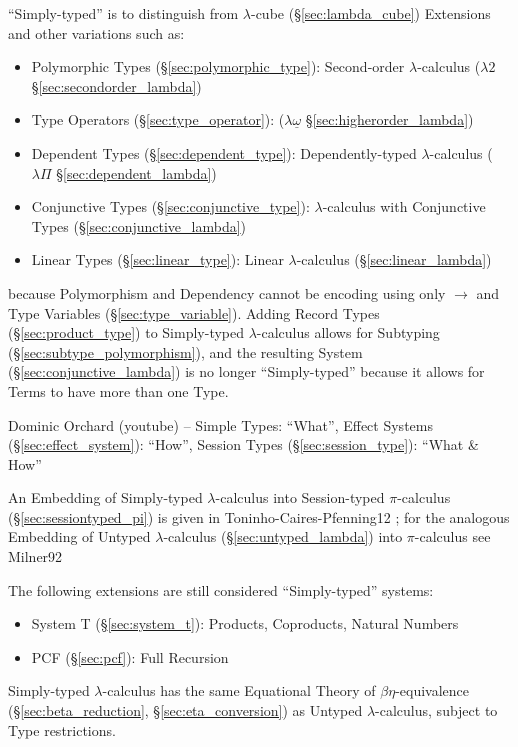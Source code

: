 ``Simply-typed'' is to distinguish from $\lambda$-cube
(\S\ref{sec:lambda_cube}) Extensions and other variations such as:
\begin{itemize}
  \item Polymorphic Types (\S\ref{sec:polymorphic_type}): Second-order
    $\lambda$-calculus ($\lambda2$ \S\ref{sec:secondorder_lambda})
  \item Type Operators (\S\ref{sec:type_operator}):
    ($\lambda\underline{\omega}$ \S\ref{sec:higherorder_lambda})
  \item Dependent Types (\S\ref{sec:dependent_type}):
    Dependently-typed $\lambda$-calculus ($\lambda\Pi$
    \S\ref{sec:dependent_lambda})
  \item Conjunctive Types (\S\ref{sec:conjunctive_type}):
    $\lambda$-calculus with Conjunctive Types
    (\S\ref{sec:conjunctive_lambda})
  \item Linear Types (\S\ref{sec:linear_type}): Linear
    $\lambda$-calculus (\S\ref{sec:linear_lambda})
\end{itemize}
because Polymorphism and Dependency cannot be encoding using only
$\rightarrow$ and Type Variables (\S\ref{sec:type_variable}). Adding
Record Types (\S\ref{sec:product_type}) to Simply-typed
$\lambda$-calculus allows for Subtyping
(\S\ref{sec:subtype_polymorphism}), and the resulting System
(\S\ref{sec:conjunctive_lambda}) is no longer ``Simply-typed'' because
it allows for Terms to have more than one Type.

Dominic Orchard (youtube) -- Simple Types: ``What'', Effect Systems
(\S\ref{sec:effect_system}): ``How'', Session Types
(\S\ref{sec:session_type}): ``What \& How''

\fist An Embedding of Simply-typed $\lambda$-calculus into
Session-typed $\pi$-calculus (\S\ref{sec:sessiontyped_pi}) is given in
Toninho-Caires-Pfenning12 \cite{caires-pfenning-toninho12}; for the
analogous Embedding of Untyped $\lambda$-calculus
(\S\ref{sec:untyped_lambda}) into $\pi$-calculus see Milner92
\cite{milner92}

The following extensions are still considered ``Simply-typed''
systems:
\begin{itemize}
  \item System T (\S\ref{sec:system_t}): Products, Coproducts, Natural
    Numbers
  \item PCF (\S\ref{sec:pcf}): Full Recursion
\end{itemize}

Simply-typed $\lambda$-calculus has the same Equational Theory of
$\beta\eta$-equivalence (\S\ref{sec:beta_reduction},
\S\ref{sec:eta_conversion}) as Untyped $\lambda$-calculus, subject to
Type restrictions.

